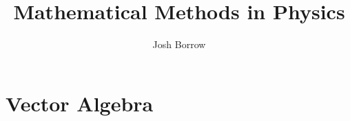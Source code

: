 \documentclass[11pt]{report}
\begin{document}
\title{Mathematical Methods in Physics}
\author{Josh Borrow}

\maketitle

\chapter{Vector Algebra}



\end{document}
